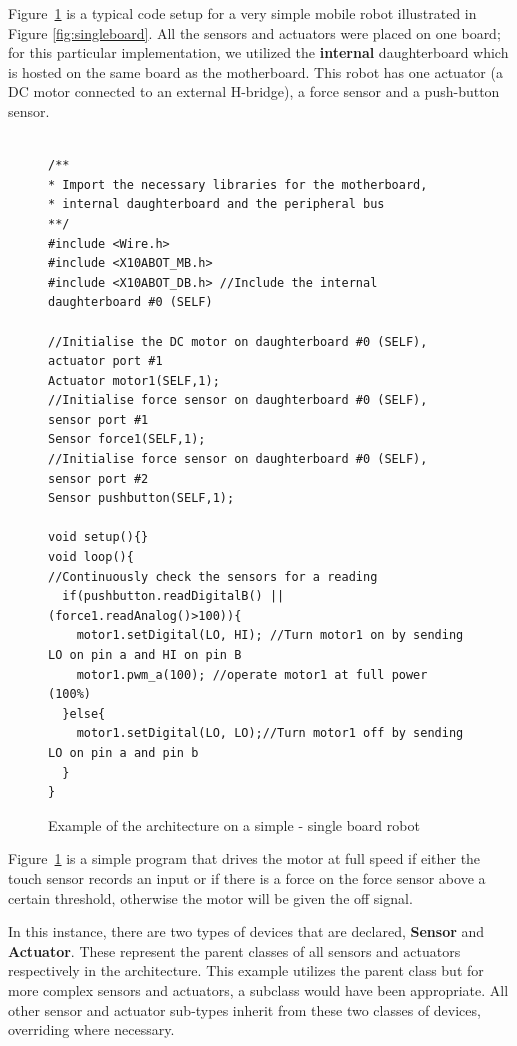 Figure~\ref{code:example} is a typical code setup for a very simple mobile robot illustrated in Figure \ref{fig:singleboard}. All the sensors and actuators were placed on one board; for this particular implementation, we utilized the \textbf{internal} daughterboard which is hosted on the same board as the motherboard. This robot has one actuator (a DC motor connected to an external H-bridge), a force sensor and a push-button sensor.


	\begin{figure}
		\footnotesize
    {\fontsize{8}{6}\selectfont
		\begin{verbatim}

/**
* Import the necessary libraries for the motherboard, 
* internal daughterboard and the peripheral bus
**/
#include <Wire.h>  
#include <X10ABOT_MB.h>
#include <X10ABOT_DB.h> //Include the internal daughterboard #0 (SELF)

//Initialise the DC motor on daughterboard #0 (SELF), actuator port #1
Actuator motor1(SELF,1);
//Initialise force sensor on daughterboard #0 (SELF), sensor port #1
Sensor force1(SELF,1);
//Initialise force sensor on daughterboard #0 (SELF), sensor port #2
Sensor pushbutton(SELF,1);

void setup(){}
void loop(){
//Continuously check the sensors for a reading
  if(pushbutton.readDigitalB() || (force1.readAnalog()>100)){
    motor1.setDigital(LO, HI); //Turn motor1 on by sending LO on pin a and HI on pin B
    motor1.pwm_a(100); //operate motor1 at full power (100%) 
  }else{
    motor1.setDigital(LO, LO);//Turn motor1 off by sending LO on pin a and pin b
  }
}	 
	\end{verbatim}
  }
		\caption{Example of the \xten architecture on a simple - single board robot} \label{code:example}
	\end{figure}



Figure~\ref{code:example} is a simple program that drives the motor at full speed if either the touch sensor records an input or if there is a force on the force sensor above a certain threshold, otherwise the motor will be given the off signal.

In this instance, there are two types of devices that are declared, \textbf{Sensor} and \textbf{Actuator}. These represent the parent classes of all sensors and actuators respectively in the \xten architecture. This example utilizes the parent class but for more complex sensors and actuators, a subclass would have been appropriate. All other sensor and actuator sub-types inherit from these two classes of devices, overriding where necessary.

